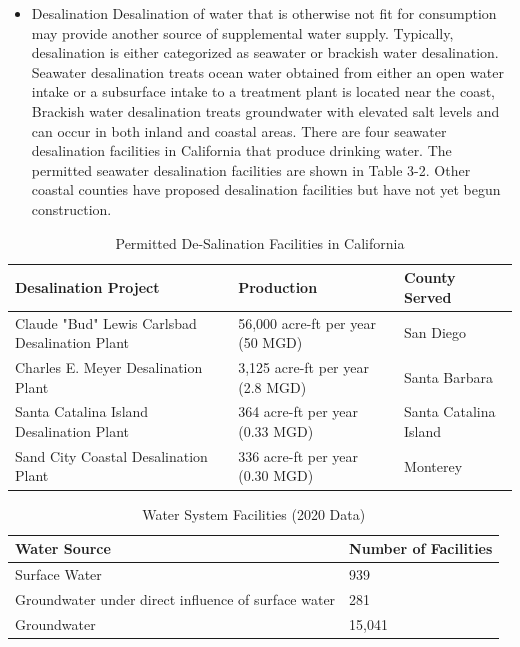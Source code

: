 \begin{itemize}
\begin{enumerate}
\begin{itemize}
\item Desalination
Desalination of water that is otherwise not fit for consumption may provide another source of supplemental water supply. Typically, desalination is either categorized as seawater or brackish water desalination. Seawater desalination treats ocean water obtained from either an open water intake or a subsurface intake to a treatment plant is located near the coast, Brackish water desalination treats groundwater with elevated salt levels and can occur in both inland and coastal areas.
There are four seawater desalination facilities in California that produce drinking water. The permitted seawater desalination facilities are shown in Table 3-2. Other coastal counties have proposed desalination facilities but have not yet begun construction.
\end{itemize}

\begin{table}[]
\begin{tabular}{|l|l|l|}
\hline
Desalination   Project                                   & Production                                 & County   Served           \\ \hline
Claude   "Bud"   Lewis   Carlsbad   Desalination   Plant & 56,000   acre-ft   per   year   (50   MGD) & San   Diego               \\ \hline
Charles   E.   Meyer   Desalination   Plant              & 3,125   acre-ft   per   year   (2.8 MGD)   & Santa   Barbara           \\ \hline
Santa   Catalina   Island   Desalination   Plant         & 364   acre-ft   per   year   (0.33   MGD)  & Santa   Catalina   Island \\ \hline
Sand   City   Coastal Desalination   Plant               & 336   acre-ft   per   year   (0.30   MGD)  & Monterey                  \\ \hline
\end{tabular}
\caption{Permitted De-Salination Facilities in California}
\end{table}



\begin{table}[]
\begin{tabular}{|l|l|}
\hline
Water   Source                                                  & Number   of   Facilities \\ \hline
Surface   Water                                                 & 939                      \\ \hline
Groundwater   under   direct   influence   of   surface   water & 281                      \\ \hline
Groundwater                                                     & 15,041                   \\ \hline
\end{tabular}
\caption{Water System Facilities (2020 Data)}
\end{table}




\end{enumerate}
\end{itemize}
